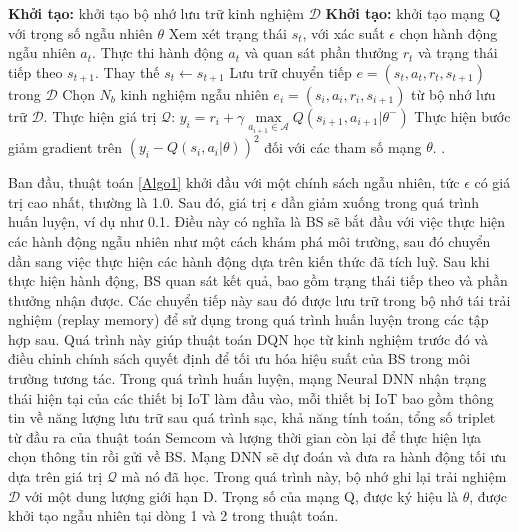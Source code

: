 \documentclass{article} %
\begin{document}
\begin{algorithm}[!ht]
\caption{Thuật toán DQN}
\begin{algorithmic}[1]
\STATE \textbf{Khởi tạo:} khởi tạo bộ nhớ lưu trữ kinh nghiệm $\mathcal{D}$
    \STATE \textbf{Khởi tạo:} khởi tạo mạng Q với trọng số ngẫu nhiên $\theta$
            \STATE Xem xét trạng thái $s_t$, với xác suất $\epsilon$ chọn hành động ngẫu nhiên $a_t$.
            \STATE Thực thi hành động $a_t$ và quan sát phần thưởng $r_t$ và trạng thái tiếp theo $s_{t+1}$. 
            \STATE Thay thế $s_t \gets s_{t+1}$
            \STATE Lưu trữ chuyển tiếp $e =(s_t,a_t,r_t,s_{t+1})$ trong $\mathcal{D}$
            \STATE Chọn $N_b$ kinh nghiệm ngẫu nhiên $e_i =(s_i,a_i,r_i,s_{i+1})$ từ bộ nhớ lưu trữ $\mathcal{D}$.
            \STATE Thực hiện giá trị $\mathcal{Q}$:
            \STATE $y_i = r_i+ \gamma \underset{a_{i+1} \in \mathbf{\mathcal{A}} }{\mathop{\mathrm{max}}}Q(s_{i+1},a_{i+1}|\theta^-)$
            \STATE Thực hiện bước giảm gradient trên $(y_i-Q(s_i, a_i| \theta))^2$ đối với các tham số mạng $\theta$.
        \ENDFOR
    \ENDFOR.
\end{algorithmic}
\label{Algo1}
\end{algorithm}



Ban đầu, thuật toán \ref{Algo1} khởi đầu với một chính sách ngẫu nhiên, tức $\epsilon$ có giá trị cao nhất, thường là 1.0. Sau đó, giá trị $\epsilon$ dần giảm xuống trong quá trình huấn luyện, ví dụ như 0.1. Điều này có nghĩa là BS sẽ bắt đầu với việc thực hiện các hành động ngẫu nhiên như một cách khám phá môi trường, sau đó chuyển dần sang việc thực hiện các hành động dựa trên kiến thức đã tích luỹ. 
Sau khi thực hiện hành động, BS quan sát kết quả, bao gồm trạng thái tiếp theo và phần thưởng nhận được. Các chuyển tiếp này sau đó được lưu trữ trong bộ nhớ tái trải nghiệm (replay memory) để sử dụng trong quá trình huấn luyện trong các tập hợp sau. Quá trình này giúp thuật toán DQN học từ kinh nghiệm trước đó và điều chỉnh chính sách quyết định để tối ưu hóa hiệu suất của BS trong môi trường tương tác.
Trong quá trình huấn luyện, mạng Neural DNN nhận trạng thái hiện tại của các thiết bị IoT làm đầu vào, mỗi thiết bị IoT bao gồm thông tin về năng lượng lưu trữ sau quá trình sạc, khả năng tính toán, tổng số triplet từ đầu ra của thuật toán Semcom và lượng thời gian còn lại để thực hiện lựa chọn thông tin rồi gửi về BS. Mạng DNN sẽ dự đoán và đưa ra hành động tối ưu dựa trên giá trị $\mathcal{Q}$ mà nó đã học. Trong quá trình này, bộ nhớ ghi lại trải nghiệm $\mathcal{D}$ với một dung lượng giới hạn D. Trọng số của mạng Q, được ký hiệu là $\theta$, được khởi tạo ngẫu nhiên tại dòng 1 và 2 trong thuật toán.
\end{document}
